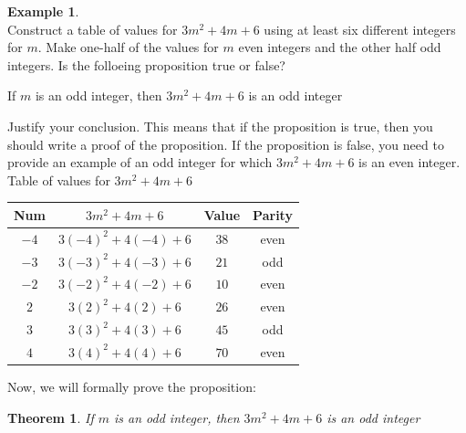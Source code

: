 \documentclass{book}
\newtheorem{theorem}{Theorem}[section]
\theoremstyle{definition}
\newtheorem{example}{Example}[definition]
\theoremstyle{remark}
\begin{document}
\begin{example}
\cite[Chap.1, P.C.1.10]{ted} \\

Construct a table of values for $3m^2 + 4m + 6$ using at least six different integers for $m$. Make one-half of the values for $m$ even integers and the other half odd integers. Is the folloeing proposition true or false? \\

\begin{center}
    If $m$ is an odd integer, then $3m^2 + 4m + 6$ is an odd integer
\end{center}

Justify your conclusion. This means that if the proposition is true, then you should write a proof of the proposition. If the proposition is false, you need to provide an example of an odd integer for which $3m^2 + 4m + 6$ is an even integer. \\


Table of values for $3m^2 + 4m + 6$ \\
\begin{center}
    \begin{tabular}{|c|c|c|c|}
        \hline 
        Num & $3m^2 + 4m + 6$ & Value & Parity \\ 
        \hline 
        $-4$ & $3(-4)^2 + 4(-4) + 6$ & $38$ & even \\ 
        \hline 
        $-3$ & $3(-3)^2 + 4(-3) + 6$ & $21$ & odd \\ 
        \hline 
        $-2$ & $3(-2)^2 + 4(-2) + 6$ & $10$ & even \\ 
        \hline 
        $2$ & $3(2)^2 + 4(2) + 6$ & $26$ & even \\ 
        \hline 
        $3$ & $3(3)^2 + 4(3) + 6$ & $45$ & odd \\ 
        \hline 
        $4$ & $3(4)^2 + 4(4) + 6$ & $70$ & even \\ 
        \hline 
    \end{tabular} 
\end{center}

Now, we will formally prove the proposition: \\

\begin{tcolorbox}
    \begin{theorem}
        If $m$ is an odd integer, then $3m^2 + 4m + 6$ is an odd integer
    \end{theorem}
\end{tcolorbox}


\end{example}
\end{document}
